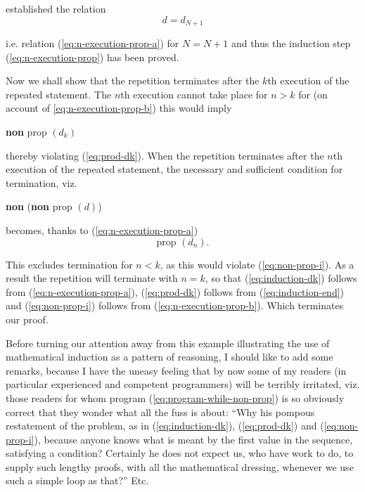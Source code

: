 \noindent
established the relation
$$
d = d_{N + 1}
$$

\noindent
i.e. relation (\ref{eq:n-execution-prop-a}) for $N = N + 1$ and thus the induction step (\ref{eq:n-execution-prop}) has been
proved.

Now we shall show that the repetition terminates after the $k$th execution of the repeated statement. The $n$th execution cannot take place for $n > k$
for (on account of \ref{eq:n-execution-prop-b}) this would imply
\begin{center}
	\textbf{non} prop $(d_k)$
\end{center}

\noindent 
thereby violating (\ref{eq:prod-dk}). When the repetition terminates after the $n$th execution of the repeated statement, the necessary and sufficient condition for termination, viz.
\begin{center}
	\textbf{non} (\textbf{non} prop $(d)$)
\end{center}

\noindent
becomes, thanks to (\ref{eq:n-execution-prop-a})
\begin{equation}
	\label{eq:induction-end}
	\text{prop } (d_n).
\end{equation}

This excludes termination for $n < k$, as this would violate (\ref{eq:non-prop-i}). As a result the repetition will terminate with $n = k$, so that (\ref{eq:induction-dk}) follows from (\ref{eq:n-execution-prop-a}), (\ref{eq:prod-dk}) follows from (\ref{eq:induction-end}) and (\ref{eq:non-prop-i}) follows from (\ref{eq:n-execution-prop-b}). Which terminates our proof.

Before turning our attention away from this example illustrating the use of mathematical induction as a pattern of reasoning, I should like to add some remarks, because I have the uneasy feeling that by now some of my readers (in particular experienced and competent programmers) will be terribly irritated, viz. those readers for whom program (\ref{eq:program-while-non-prop}) is so obviously correct that they wonder what all the fuss is about: ``Why his pompous restatement of the problem, as in (\ref{eq:induction-dk}), (\ref{eq:prod-dk}) and (\ref{eq:non-prop-i}), because anyone knows what is meant by the first value in the sequence, satisfying a condition? Certainly he does not expect us, who have work to do, to supply such lengthy proofs, with all the mathematical dressing, whenever we use such a simple loop as that?'' Etc.

